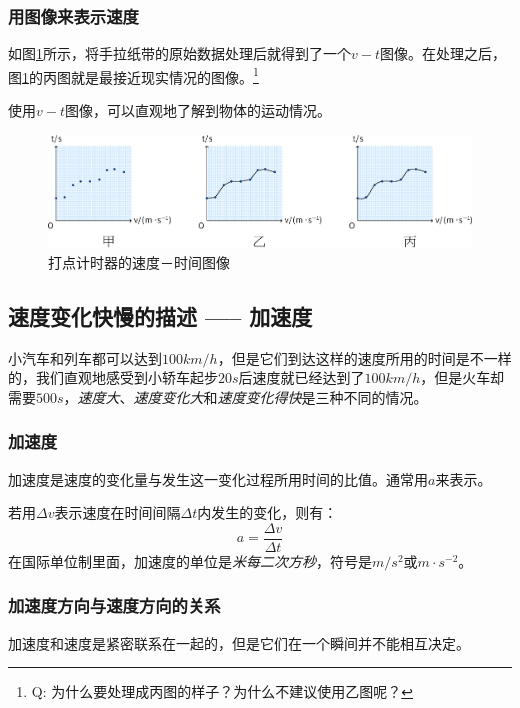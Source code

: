 			\subsubsection*{用图像来表示速度}
				如图\ref{Pic::打点计时器的速度－时间图像}所示，将手拉纸带的原始数据处理后就得到了一个$v-t$图像。在处理之后，图\ref{Pic::打点计时器的速度－时间图像}的丙图就是最接近现实情况的图像。\footnote{Q: 为什么要处理成丙图的样子？为什么不建议使用乙图呢？}

				使用$v-t$图像，可以直观地了解到物体的运动情况。
				\begin{figure}[!h]
					\begin{center}
						\includegraphics[scale=0.5]{PIC/006.eps}
						\caption{打点计时器的速度－时间图像}
						\label{Pic::打点计时器的速度－时间图像}
					\end{center}
				\end{figure}

			\subsection{速度变化快慢的描述 ----- 加速度}
				小汽车和列车都可以达到$100 km/h$，但是它们到达这样的速度所用的时间是不一样的，我们直观地感受到小轿车起步$20s$后速度就已经达到了$100 km/h$，但是火车却需要$500 s$，\emph{速度大}、\emph{速度变化大}和\emph{速度变化得快}是三种不同的情况。
				
				\subsubsection*{加速度}
					加速度是速度的变化量与发生这一变化过程所用时间的比值。通常用$a$来表示。

					若用$\Delta v$表示速度在时间间隔$\Delta t$内发生的变化，则有：
						$$a=\frac{\Delta v}{\Delta t}$$
					在国际单位制里面，加速度的单位是\emph{米每二次方秒}，符号是$m/s^2$或$m\cdot s^{-2}$。

				\subsubsection*{加速度方向与速度方向的关系}
					加速度和速度是紧密联系在一起的，但是它们在一个瞬间并不能相互决定。

